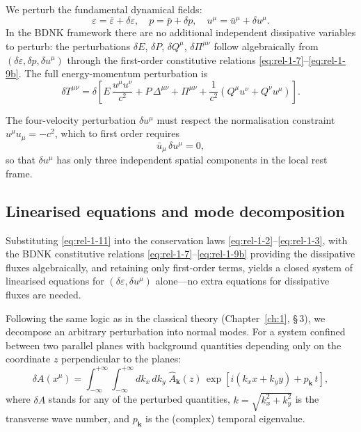 We perturb the fundamental dynamical fields:
\begin{equation}
\label{eq:rel-1-11}
\varepsilon = \bar\varepsilon + \delta\varepsilon, \quad
p = \bar p + \delta p, \quad
u^{\mu} = \bar u^{\mu} + \delta u^{\mu}.
\end{equation}
In the BDNK framework there are no additional independent dissipative
variables to perturb: the perturbations $\delta E$, $\delta P$,
$\delta Q^{\mu}$, $\delta\Pi^{\mu\nu}$ follow algebraically from
$(\delta\varepsilon, \delta p, \delta u^{\mu})$ through the
first-order constitutive relations
\eqref{eq:rel-1-7}--\eqref{eq:rel-1-9b}.  The full energy-momentum
perturbation is
\begin{equation}
\label{eq:rel-1-12}
\delta T^{\mu\nu}
  = \delta\!\left[
    E\,\frac{u^{\mu}u^{\nu}}{c^{2}}
    + P\,\Delta^{\mu\nu}
    + \Pi^{\mu\nu}
    + \frac{1}{c^{2}}(Q^{\mu}u^{\nu}+Q^{\nu}u^{\mu})
  \right].
\end{equation}

The four-velocity perturbation $\delta u^{\mu}$ must respect the
normalisation constraint $u^{\mu}u_{\mu}=-c^{2}$, which to first
order requires
\begin{equation}
\label{eq:rel-1-13}
\bar u_{\mu}\,\delta u^{\mu} = 0,
\end{equation}
so that $\delta u^{\mu}$ has only three independent spatial
components in the local rest frame.

\subsection{Linearised equations and mode decomposition}

Substituting \eqref{eq:rel-1-11} into the conservation laws
\eqref{eq:rel-1-2}--\eqref{eq:rel-1-3}, with the BDNK constitutive
relations \eqref{eq:rel-1-7}--\eqref{eq:rel-1-9b} providing the
dissipative fluxes algebraically, and retaining only first-order
terms, yields a closed system of linearised equations for
$(\delta\varepsilon, \delta u^{\mu})$ alone---no extra equations for
dissipative fluxes are needed.

Following the same logic as in the classical theory
(Chapter~\ref{ch:1}, \S\,3), we decompose an arbitrary perturbation
into normal modes.  For a system confined between two parallel planes
with background quantities depending only on the coordinate $z$
perpendicular to the planes:
\begin{equation}
\label{eq:rel-1-14}
\delta A(x^{\mu}) = \int_{-\infty}^{+\infty}\int_{-\infty}^{+\infty}
  dk_x\,dk_y\;
  \hat A_{\mathbf{k}}(z)\,
  \exp\!\left[i(k_x x + k_y y) + p_{\mathbf{k}}\,t\right],
\end{equation}
where $\delta A$ stands for any of the perturbed quantities,
$k=\sqrt{k_x^{2}+k_y^{2}}$ is the transverse wave number, and
$p_{\mathbf{k}}$ is the (complex) temporal eigenvalue.

